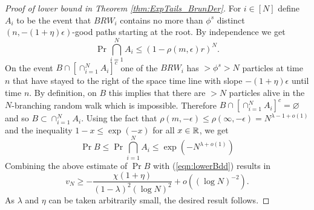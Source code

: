 \begin{proof}[Proof of lower bound in Theorem \ref{thm:ExpTails_BrunDer}]
For $i \in [N]$ define $A_i$ to be the event that $BRW_i$ contains no more than $\phi^s$ distinct $(n, - (1+\eta)\epsilon)$-good paths starting at the root. By independence we get
\begin{equation}\nonumber
\Pr{\bigcap\limits_{i=1}^N A_i} \leq (1 - \rho(m, \epsilon) r)^N. 
\end{equation}
On the event $B \cap [\cap_{i=1}^N A_i]^c$ one of the $BRW_i$ has $> \phi^s > N$ particles at time $n$ that have stayed to the right of the space time line with slope $ - (1 + \eta)\epsilon$ until time $n$. By definition, on $B$ this implies that there are $> N$ particles alive in the $N$-branching random walk which is impossible. Therefore $B \cap [\cap_{i=1}^N A_i]^c = \varnothing$ and so $B \subset \cap_{i=1}^N A_i$. Using the fact that $\rho(m, - \epsilon) \leq \rho(\infty, - \epsilon) = N^{\lambda - 1 + o(1)}$ and the inequality $1 - x \leq \exp(-x)$ for all $x \in \mathbb{R}$, we get
\begin{equation}\label{eqn:ExpTailsBBound}
\Pr{B} \leq \Pr{\bigcap\limits_{i=1}^N A_i} \leq \exp(-N^{\lambda + o(1)})
\end{equation}
Combining the above estimate of $\Pr{B}$ with (\ref{eqn:lowerBdd}) results in 
\begin{equation}\nonumber
v_N \geq - \frac{\chi (1 + \eta)}{(1 - \lambda)^2(\log N)^2} + o((\log N)^{-2}). 
\end{equation} 
As $\lambda$ and $\eta$ can be taken arbitrarily small, the desired result follows. 
\end{proof}

\newpage
